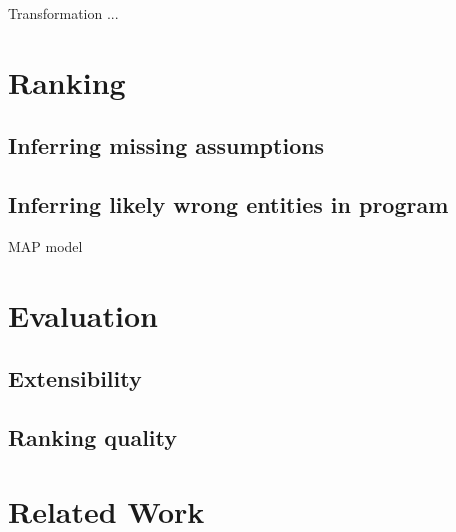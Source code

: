 Transformation ... 

% 
% 
% 
% 
% 
% 
\section{Ranking}
\label{sec:ranking}

\subsection{Inferring missing assumptions}
\label{sec:assumptions}

\subsection{Inferring likely wrong entities in program}

MAP model

\section{Evaluation}
\label{sec:evaluation}

\subsection{Extensibility}

\subsection{Ranking quality}

\section{Related Work}

